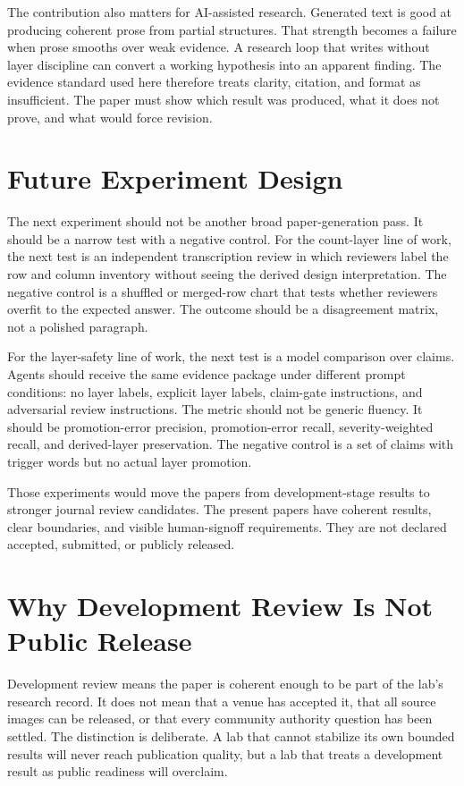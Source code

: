 \documentclass[sigconf,nonacm]{acmart}
\begin{document}
The contribution also matters for AI-assisted research. Generated text is good
at producing coherent prose from partial structures. That strength becomes a
failure when prose smooths over weak evidence. A research loop that writes
without layer discipline can convert a working hypothesis into an apparent
finding. The evidence standard used here therefore treats clarity, citation, and
format as insufficient. The paper must show which result was produced, what it
does not prove, and what would force revision.

\section{Future Experiment Design}
The next experiment should not be another broad paper-generation pass. It should
be a narrow test with a negative control. For the count-layer line of work, the
next test is an independent transcription review in which reviewers label the
row and column inventory without seeing the derived design interpretation. The
negative control is a shuffled or merged-row chart that tests whether reviewers
overfit to the expected answer. The outcome should be a disagreement matrix,
not a polished paragraph.

For the layer-safety line of work, the next test is a model comparison over
claims. Agents should receive the same evidence package under different prompt
conditions: no layer labels, explicit layer labels, claim-gate instructions, and
adversarial review instructions. The metric should not be generic fluency. It
should be promotion-error precision, promotion-error recall, severity-weighted
recall, and derived-layer preservation. The negative control is a set of claims
with trigger words but no actual layer promotion.

Those experiments would move the papers from development-stage results to
stronger journal review candidates. The present papers have coherent results,
clear boundaries, and visible human-signoff requirements. They are not declared
accepted, submitted, or publicly released.

\section{Why Development Review Is Not Public Release}
Development review means the paper is coherent enough to be part of the lab's
research record. It does not mean that a venue has accepted it, that all source
images can be released, or that every community authority question has been
settled. The distinction is deliberate. A lab that cannot stabilize its own
bounded results will never reach publication quality, but a lab that treats a
development result as public readiness will overclaim.
\end{document}
